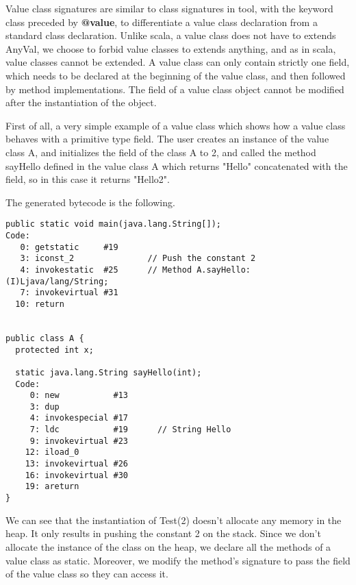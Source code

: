 
Value class signatures are similar to class signatures in tool, with the keyword class preceded by \textbf{@value}, to differentiate a value class declaration from a standard class declaration. \newline
Unlike scala, a value class does not have to extends AnyVal, we choose to forbid value classes to extends anything, and as in scala, value classes cannot be extended.\newline
A value class can only contain strictly one field, which needs to be declared at the beginning of the value class, and then followed by method implementations. The field of a value class object cannot be modified after the instantiation of the object.\newline

First of all, a very simple example of a value class which shows how a value class behaves with a primitive type field. The user creates an instance of the value class A, and initializes the field of the class A to 2, and called the method sayHello defined in the value class A which returns "Hello" concatenated with the field, so in this case it returns "Hello2".



The generated bytecode is the following.

\begin{lstlisting}
public static void main(java.lang.String[]);
Code:
   0: getstatic     #19 
   3: iconst_2               // Push the constant 2 
   4: invokestatic  #25      // Method A.sayHello:(I)Ljava/lang/String;
   7: invokevirtual #31 
  10: return


public class A {
  protected int x;

  static java.lang.String sayHello(int);
  Code:
     0: new           #13
     3: dup
     4: invokespecial #17
     7: ldc           #19      // String Hello
     9: invokevirtual #23
    12: iload_0
    13: invokevirtual #26
    16: invokevirtual #30
    19: areturn
}
\end{lstlisting}

We can see that the instantiation of Test(2) doesn't allocate any memory in the heap. 
It only results in pushing the constant 2 on the stack. \newline
Since we don't allocate the instance of the class on the heap, we declare all the methods of a value class as static. Moreover, we modify the method's signature to pass the field of the value class so they can access it.

